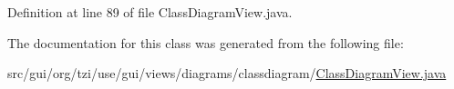 Definition at line 89 of file Class\-Diagram\-View.\-java.



The documentation for this class was generated from the following file\-:\begin{DoxyCompactItemize}
\item 
src/gui/org/tzi/use/gui/views/diagrams/classdiagram/\hyperlink{_class_diagram_view_8java}{Class\-Diagram\-View.\-java}\end{DoxyCompactItemize}

